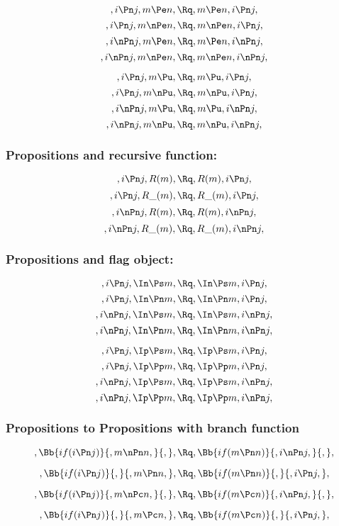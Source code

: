 \[,i \Pn j, m \Pe n, \Rq , m \Pe n, i \Pn j,\]
\[,i \Pn j, m \nPe n, \Rq , m \nPe n, i \Pn j,\]
\[,i \nPn j, m \Pe n, \Rq , m \Pe n, i \nPn j,\]
\[,i \nPn j, m \nPe n, \Rq , m \nPe n, i \nPn j,\]

\[,i \Pn j, m \Pu, \Rq , m \Pu, i \Pn j,\]
\[,i \Pn j, m \nPu, \Rq , m \nPu, i \Pn j,\]
\[,i \nPn j, m \Pu, \Rq , m \Pu, i \nPn j,\]
\[,i \nPn j, m \nPu, \Rq , m \nPu, i \nPn j,\]



\bigskip
\bigskip
\bigskip
\bigskip
\subsubsection{ Propositions and recursive function:}
\[,i \Pn j, R(m), \Rq , R(m), i \Pn j,\]
\[,i \Pn j, R\_(m), \Rq , R\_(m), i \Pn j,\]
\[,i \nPn j,R(m), \Rq , R(m), i \nPn j,\]
\[,i \nPn j, R\_(m), \Rq , R\_(m), i \nPn j,\]



\bigskip
\bigskip
\bigskip
\bigskip
\subsubsection{ Propositions and flag object:}
\[,i \Pn j, \In \Ps m, \Rq , \In \Ps m, i \Pn j,\]
\[,i \Pn j, \In \Pn m, \Rq , \In \Pn m, i \Pn j,\]
\[,i \nPn j,\In \Ps m, \Rq , \In \Ps m, i \nPn j,\]
\[,i \nPn j, \In \Pn m, \Rq , \In \Pn m, i \nPn j,\]

\[,i \Pn j, \Ip \Ps m, \Rq , \Ip \Ps m, i \Pn j,\]
\[,i \Pn j, \Ip \Pp m, \Rq , \Ip \Pp m, i \Pn j,\]
\[,i \nPn j,\Ip \Ps m, \Rq , \Ip \Ps m, i \nPn j,\]
\[,i \nPn j, \Ip \Pp m, \Rq , \Ip \Pp m, i \nPn j,\]





\bigskip
\bigskip
\bigskip
\bigskip
\subsubsection{ Propositions to Propositions with branch function}
\[, \Bb{if(i \Pn j)}{,m \nPn n,}{,}, \Rq , \Bb{if(m \Pn n)}{,i \nPn j,}{,},\]

\bigskip
\bigskip
\[, \Bb{if(i \Pn j)}{,}{,m \Pn n,}, \Rq , \Bb{if(m \Pn n)}{,}{,i \Pn j,},\]


\bigskip
\bigskip
\[, \Bb{if(i \Pn j)}{,m \nPc n,}{,}, \Rq , \Bb{if(m \Pc n)}{,i \nPn j,}{,},\]

\bigskip
\bigskip
\[, \Bb{if(i \Pn j)}{,}{,m \Pc n,}, \Rq , \Bb{if(m \Pc n)}{,}{,i \Pn j,},\]


